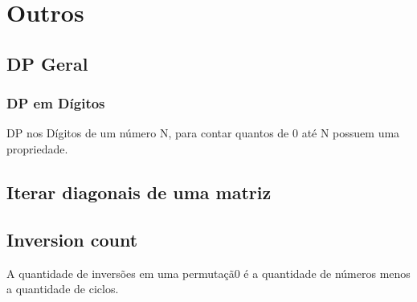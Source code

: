 \section{Outros}

\subsection{DP Geral}
\subsubsection{DP em D\'{i}gitos}
DP nos D\'{i}gitos de um n\'{u}mero N, para contar quantos de 0 at\'{e} N possuem uma propriedade.

\divisor
\subsection{Iterar diagonais de uma matriz}
\divisor

\subsection{Inversion count}
A quantidade de invers\~{o}es em uma permuta\c{c}\~{a}0 \'{e} a quantidade de n\'{u}meros menos a quantidade de ciclos.

